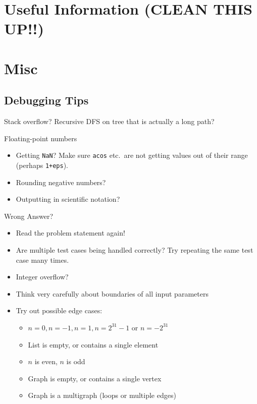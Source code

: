 \section{Useful Information (CLEAN THIS UP!!)}
  \section{Misc}
    \subsection{Debugging Tips}
      \begin{myitemize}
        \item Stack overflow? Recursive DFS on tree that is actually a long path?
        \item Floating-point numbers
          \begin{itemize}
            \item Getting \texttt{NaN}? Make sure \texttt{acos} etc.\ are
              not getting values out of their range (perhaps
              \texttt{1+eps}).
            \item Rounding negative numbers?
            \item Outputting in scientific notation?
          \end{itemize}
        \item Wrong Answer?
          \begin{itemize}
            \item Read the problem statement again!
            \item Are multiple test cases being handled correctly?
              Try repeating the same test case many times.
            \item Integer overflow?
            \item Think very carefully about boundaries of all input parameters
            \item Try out possible edge cases:
              \begin{itemize}
                \item $n=0, n=-1, n=1, n=2^{31}-1$ or $n=-2^{31}$
                \item List is empty, or contains a single element
                \item $n$ is even, $n$ is odd
                \item Graph is empty, or contains a single vertex
                \item Graph is a multigraph (loops or multiple edges)

\end{itemize}
\end{itemize}
\end{myitemize}
